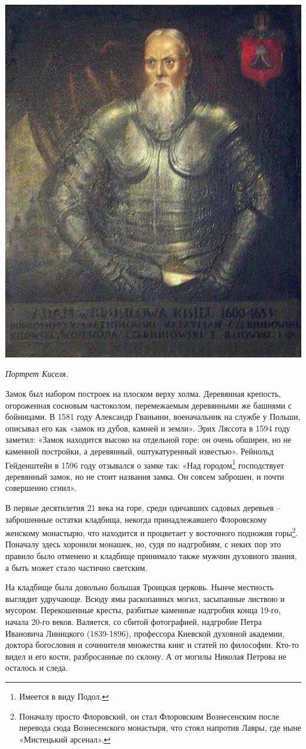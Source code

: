 \begin{center}
\includegraphics[width=0.40\linewidth]{chast-colebanie-osnov/gora-zamkovaya-valovaya/adam_kisiel.jpg}

\textit{Портрет Киселя.}
\end{center}

Замок был набором построек на плоском верху холма. Деревянная крепость, огороженная сосновым частоколом, перемежаемым деревянными же башнями с бойницами. В 1581 году Александр Гваньини, военачальник на службе у Польши, описывал его как «замок из дубов, камней и земли». Эрих Ляссота в 1594 году заметил: «Замок находится высоко на отдельной горе: он очень обширен, но не каменной постройки, а деревянный, оштукатуренный известью». Рейнольд Гейденштейн в 1596 году отзывался о замке так: «Над городом\footnote{Имеется в виду Подол.} господствует деревянный замок, но не стоит названия замка. Он совсем заброшен, и почти совершенно сгнил».

В первые десятилетия 21 века на горе, среди одичавших садовых деревьев – заброшенные остатки кладбища, некогда принадлежавшего Флоровскому женскому монастырю, что находится и процветает у восточного подножия горы\footnote{Поначалу просто Флоровский, он стал Флоровским Вознесенским после перевода сюда Вознесенского монастыря, что стоял напротив Лавры, где ныне «Мистецький арсенал».}. Поначалу здесь хоронили монашек, но, судя по надгробиям, с неких пор это правило было отменено и кладбище принимало также мужчин духовного звания, а быть может стало частично светским.

На кладбище была довольно большая Троицкая церковь. Нынче местность выглядит удручающе. Всюду ямы раскопанных могил, засыпанные листвою и мусором. Перекошенные кресты, разбитые каменные надгробия конца 19-го, начала 20-го веков. Валяется, со сбитой фотографией, надгробие Петра Ивановича Линицкого (1839-1896), профессора Киевской духовной академии, доктора богословия и сочинителя множества книг и статей по философии. Кто-то видел и его кости, разбросанные по склону. А от могилы Николая Петрова не осталось и следа.

